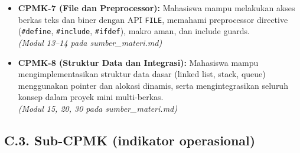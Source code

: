 \documentclass[12pt,a4paper]{article}
\begin{document}
\begin{itemize}[leftmargin=*]
  \item \textbf{CPMK-7 (File dan Preprocessor):} Mahasiswa mampu melakukan akses berkas teks dan biner dengan API \texttt{FILE}, memahami preprocessor directive (\texttt{\#define}, \texttt{\#include}, \texttt{\#ifdef}), makro aman, dan include guards.\\
  \textit{(Modul 13--14 pada sumber\_materi.md)}

  \item \textbf{CPMK-8 (Struktur Data dan Integrasi):} Mahasiswa mampu mengimplementasikan struktur data dasar (linked list, stack, queue) menggunakan pointer dan alokasi dinamis, serta mengintegrasikan seluruh konsep dalam proyek mini multi-berkas.\\
  \textit{(Modul 15, 20, 30 pada sumber\_materi.md)}
\end{itemize}

\subsection*{C.3. Sub-CPMK (indikator operasional)}
\end{document}
